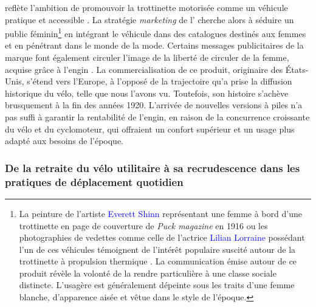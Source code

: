 \begin{refsegment}
{} reflète l’ambition de promouvoir la trottinette motorisée comme un véhicule pratique et accessible \textcolor{blue}{\autocite{smithsonian_magazine_motorized_2019}}. La stratégie \textsl{marketing} de l’ cherche alors à séduire un public féminin\footnote{
    La peinture de l'artiste \textcolor{blue}{Everett Shinn} représentant une femme à bord d'une trottinette  en page de couverture de \textit{Puck magazine} en 1916 ou les photographies de vedettes comme celle de l'actrice \textcolor{blue}{Lilian Lorraine} possédant l'un de ces véhicules témoignent de l'intérêt populaire suscité autour de la trottinette à propulsion thermique \textcolor{blue}{\autocite{hemmings_look_2011}}. La communication émise autour de ce produit révèle la volonté de la rendre particulière à une classe sociale distincte. L’usagère est généralement dépeinte sous les traits d’une femme blanche, d’apparence aisée et vêtue dans le style de l’époque.
} en intégrant le véhicule dans des catalogues destinés aux femmes et en pénétrant dans le monde de la mode. Certains messages publicitaires de la marque font également circuler l'image de la liberté de circuler de la femme, acquise grâce à l'engin \textcolor{blue}{\autocite{smithsonian_magazine_motorized_2019}}. La commercialisation de ce produit, originaire des États-Unis, s'étend vers l’Europe, à l’opposé de la trajectoire qu’a prise la diffusion historique du vélo, telle que nous l'avons vu. Toutefois, son histoire s’achève brusquement à la fin des années 1920. L’arrivée de nouvelles versions à piles n’a pas suffi à garantir la rentabilité de l’engin, en raison de la concurrence croissante du vélo et du cyclomoteur, qui offraient un confort supérieur et un usage plus adapté aux besoins de l’époque.%

\subsubsection*{De la retraite du vélo utilitaire à sa recrudescence dans les pratiques de déplacement quotidien
    \label{chap1:proximite-velo-trottinette-declin-renaissance}
    }


\end{refsegment}
